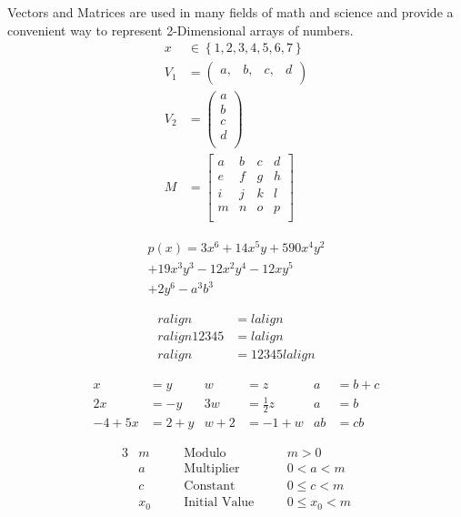 		Vectors and Matrices are used in many fields of math and science and provide a convenient way to represent 2-Dimensional arrays of numbers.
		\begin{align}
			x&\in{}\left\{1,2,3,4,5,6,7\right\}\\
			V_{1} &= {\left(
			\begin{array}{cccc}
				a, & b, & c, & d\\
			\end{array}
			\right)}\\
			V_{2} &= \left(
			\begin{array}{c}
				a \\
				b \\
				c \\
				d \\
			\end{array}
			\right)\\
			M &= {\left[
			\begin{array}{cccc}
				a & b & c & d\\
				e & f & g & h\\
				i & j & k & l\\
				m & n & o & p\\
			\end{array}
			\right]}
		\end{align}
		
		\begin{multline*}
			p(x) = 3x^6 + 14x^5y + 590x^4y^2\\
			+ 19x^3y^3 - 12x^2y^4 - 12xy^5\\
			+ 2y^6 - a^3b^3
		\end{multline*}
		
		\begin{align}
			ralign &= lalign \\
			ralign12345 &= lalign \\
			ralign &= 12345lalign
		\end{align}
		
		\begin{align*}
			 x      &=  y   &  w   &= z              &  a  &= b+c \\
			 2x     &= -y   &  3w  &= \frac{1}{2}z   &  a  &= b   \\
			-4 + 5x &= 2+y  &  w+2 &= -1+w           &  ab &= cb
		\end{align*}
		
		\begin{alignat*}{3}
			& m   \quad && \text{Modulo}        \quad && m>0\\
			& a   \quad && \text{Multiplier}    \quad && 0<a<m\\
			& c   \quad && \text{Constant}      \quad && 0\leq c<m\\
			& x_0 \quad && \text{Initial Value} \quad && 0\leq x_0 <m
		\end{alignat*}
		

